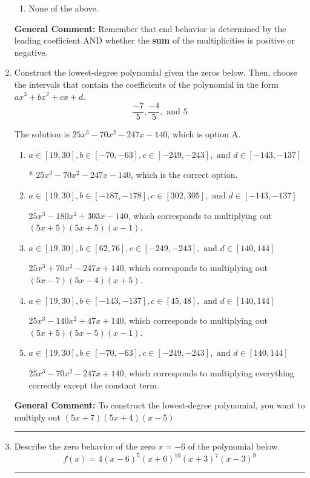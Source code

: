 \documentclass{extbook}[14pt]
\newcommand{\litem}[1]{\item #1

\rule{\textwidth}{0.4pt}}
\begin{document}
\begin{enumerate}
{\begin{enumerate}[label=\Alph*.]
\begin{multicols}{2}
\end{multicols}\item None of the above.\end{enumerate}
\textbf{General Comment:} Remember that end behavior is determined by the leading coefficient AND whether the \textbf{sum} of the multiplicities is positive or negative.
}
\litem{
Construct the lowest-degree polynomial given the zeros below. Then, choose the intervals that contain the coefficients of the polynomial in the form $ax^3+bx^2+cx+d$.
\[ \frac{-7}{5}, \frac{-4}{5}, \text{ and } 5 \]

The solution is \( 25x^{3} -70 x^{2} -247 x -140 \), which is option A.\begin{enumerate}[label=\Alph*.]
\item \( a \in [19, 30], b \in [-70, -63], c \in [-249, -243], \text{ and } d \in [-143, -137] \)

* $25x^{3} -70 x^{2} -247 x -140$, which is the correct option.
\item \( a \in [19, 30], b \in [-187, -178], c \in [302, 305], \text{ and } d \in [-143, -137] \)

$25x^{3} -180 x^{2} +303 x -140$, which corresponds to multiplying out $(5x + 5)(5x + 5)(x -1)$.
\item \( a \in [19, 30], b \in [62, 76], c \in [-249, -243], \text{ and } d \in [140, 144] \)

$25x^{3} +70 x^{2} -247 x + 140$, which corresponds to multiplying out $(5x -7)(5x -4)(x + 5)$.
\item \( a \in [19, 30], b \in [-143, -137], c \in [45, 48], \text{ and } d \in [140, 144] \)

$25x^{3} -140 x^{2} +47 x + 140$, which corresponds to multiplying out $(5x + 5)(5x -5)(x -1)$.
\item \( a \in [19, 30], b \in [-70, -63], c \in [-249, -243], \text{ and } d \in [140, 144] \)

$25x^{3} -70 x^{2} -247 x + 140$, which corresponds to multiplying everything correctly except the constant term.
\end{enumerate}

\textbf{General Comment:} To construct the lowest-degree polynomial, you want to multiply out $(5x + 7)(5x + 4)(x -5)$
}
\litem{
Describe the zero behavior of the zero $x = -6$ of the polynomial below.
\[ f(x) = 4(x - 6)^{5}(x + 6)^{10}(x + 3)^{7}(x - 3)^{9} \]

}
\end{enumerate}
\end{document}
